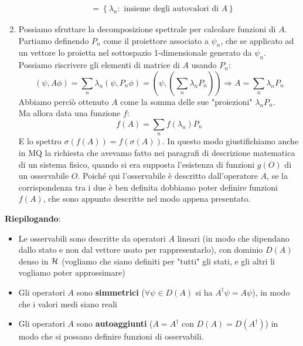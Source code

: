 \begin{enumerate}
\begin{align*}
	    &=\left\{\lambda_n:\text{ insieme degli autovalori di } A\right\}
	\end{align*}
\item Possiamo sfruttare la decomposizione spettrale per calcolare funzioni di $A$.\\
Partiamo definendo $P_n$ come il proiettore associato a $\psi_n$, che se applicato ad un vettore lo proietta nel sottospazio 1-dimensionale generato da $\psi_n$. Possiamo riscrivere gli elementi di matrice di $A$ usando $P_n$:
	\[
	\left(\psi, A\phi\right)=\sum_{n}{\lambda_n\left(\psi,P_n\phi\right)}=\left(\psi, \left(\sum_{n}{\lambda_n P_n}\right)\right) \Rightarrow A=\sum_{n}{\lambda_n P_n}
	\]
	Abbiamo perciò ottenuto $A$ come la somma delle sue "proiezioni" $\lambda_n P_n$.\\
	Ma allora data una funzione $f$:
	\begin{equation}
	f\left(A\right)=\sum_{n}{f\left(\lambda_n\right)P_n}
	\label{eqn:funzioniop}
	\end{equation}
	E lo spettro $\sigma \left(f\left(A\right)\right)=f(\sigma \left(A\right))$. 
	In questo modo giustifichiamo anche in MQ la richiesta che avevamo fatto nei paragrafi di descrizione matematica di un sistema fisico, quando si era supposta l'esistenza di funzioni $g(O)$ di un osservabile $O$. Poiché qui l'osservabile è descritto dall'operatore $A$, se la corrispondenza tra i due è ben definita dobbiamo poter definire funzioni $f(A)$, che sono appunto descritte nel modo appena presentato.
\end{enumerate}

\textbf{Riepilogando}:
\begin{itemize}
    \item Le osservabili sono descritte da operatori $A$ lineari (in modo che dipendano dallo stato e non dal vettore usato per rappresentarlo), con dominio $D(A)$ denso in $\mathcal{H}$ (vogliamo che siano definiti per "tutti" gli stati, e gli altri li vogliamo poter approssimare) %
    \item Gli operatori $A$ sono \textbf{simmetrici} ($\forall \psi \in D(A)$ si ha $A^\dag \psi = A\psi$), in modo che i valori medi siano reali
    \item Gli operatori $A$ sono \textbf{autoaggiunti} ($A = A^\dag$ con $D(A) = D(A^\dag)$) in modo che si possano definire funzioni di osservabili.
\end{itemize}

